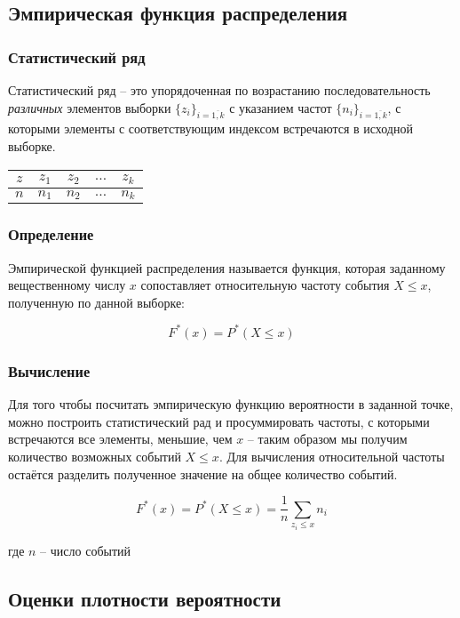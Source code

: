 \subsection{Эмпирическая функция распределения}
\subsubsection{Статистический ряд}	Статистический ряд -- это упорядоченная по возрастанию последовательность \textit{различных} элементов выборки $\{z_i\}_{i = \overline{1,k}}$ с  указанием частот $\{n_i\}_{i = \overline{1,k}}$, с которыми элементы с соответствующим индексом встречаются в исходной выборке.

\begin{tabular}{|c|c|c|c|c|}
	\hline
	$z$ & $z_1$ & $z_2$ & $\ldots$ & $z_k$ \\
	\hline
	$n$ & $n_1$ & $n_2$ & $\ldots$ & $n_k$ \\
	\hline
\end{tabular}

\subsubsection{Определение}
Эмпирической функцией распределения называется функция, которая заданному вещественному числу $x$ сопоставляет относительную частоту события $X \leq x$, полученную по данной выборке:

\begin{equation}\label{edf}
F^*(x)=P^*(X \leq x)
\end{equation}

\subsubsection{Вычисление}
Для того чтобы посчитать эмпирическую функцию вероятности в заданной точке, можно построить статистический рад и просуммировать частоты, с которыми встречаются все элементы, меньшие, чем $x$  -- таким образом мы получим количество возможных событий $X \leq x $. Для вычисления относительной частоты остаётся разделить полученное значение на общее количество событий.

\begin{equation}\label{edf}
F^*(x)=P^*(X \leq x) = \displaystyle \frac{1}{n}\sum_{z_i \leq x}{n_i}
\end{equation}

где $n$ -- число событий

\subsection{Оценки плотности вероятности}
